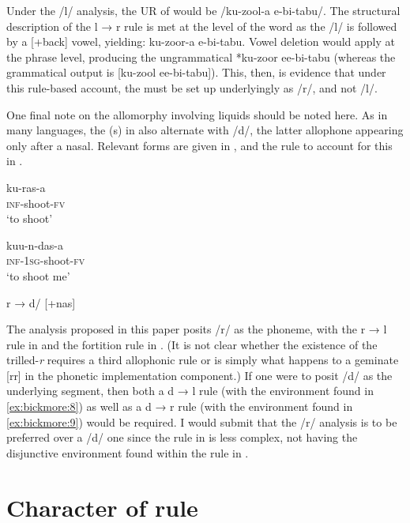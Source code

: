 \documentclass[output=paper,modfonts,nonflat,
 hidelinks
]{langsci/langscibook}
\begin{document}
Under the /l/ analysis, the UR of  would be /ku-zool-a e-bi-tabu/. The structural description of the l → r rule is met at the level of the word as the /l/ is followed by a [+back] vowel, yielding: ku-zoor-a e-bi-tabu. Vowel deletion would apply at the phrase level, producing the ungrammatical *ku-zoor ee-bi-tabu (whereas the grammatical output is [ku-zool ee-bi-tabu]). This, then, is evidence that under this rule-based account, the  must be set up underlyingly as /r/, and not /l/.

One final note on the allomorphy involving liquids should be noted here. As in many  languages, the (s) in  also alternate with /d/, the latter allophone appearing only after a nasal. Relevant  forms are given in , and the rule to account for this in .

\ea\label{ex:bickmore:24}
\ea\label{ex:bickmore:24a}
\gll ku-ras-a\\
\textsc{inf}{}-shoot-\textsc{fv}\\
\glt ‘to shoot’

\ex\label{ex:bickmore:24b}
\gll kuu-n-das-a\\
\textsc{inf}{}-\textsc{1sg}{}-shoot-\textsc{fv}\\
\glt ‘to shoot me’
\z
\z

\ea\label{ex:bickmore:25}
r → d/ [+nas] \underline{ }\underline{ }\underline{ }  
\z

The analysis proposed in this paper posits /r/ as the phoneme, with the r → l rule in  and the fortition rule in . (It is not clear whether the existence of the trilled-\textit{r} requires a third allophonic rule or is simply what happens to a geminate [rr] in the phonetic implementation component.) If one were to posit /d/ as the underlying segment, then both a d → l rule (with the environment found in \ref{ex:bickmore:8}) as well as a d → r rule (with the environment found in \ref{ex:bickmore:9}) would be required. I would submit that the /r/ analysis is to be preferred over a /d/ one since the rule in  is less complex, not having the disjunctive environment found within the rule in . 

\section{Character of rule}
\end{document}
